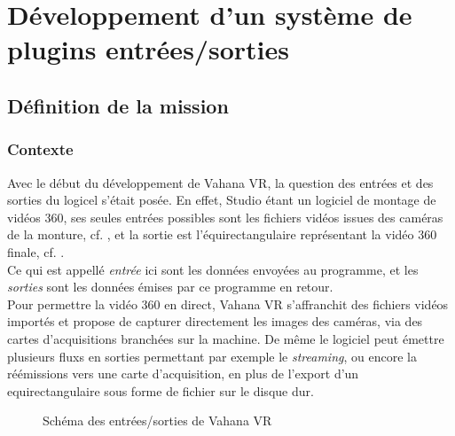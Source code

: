 \chapter{Développement d'un système de plugins entrées/sorties}

\section{Définition de la mission}
\subsection{Contexte}
Avec le début du développement de Vahana VR, la question des entrées et des sorties
du logicel s'était posée. En effet, Studio étant un logiciel de montage de vidéos
360, ses seules entrées possibles sont les fichiers vidéos issues des caméras de la monture,
cf. , et la sortie est l'équirectangulaire représentant
la vidéo 360 finale, cf. .\\
Ce qui est appellé \emph{entrée} ici sont les données envoyées au programme, et
les \emph{sorties} sont les données émises par ce programme en retour.\\
Pour permettre la vidéo 360 en direct, Vahana VR s'affranchit des fichiers
vidéos importés et propose de capturer directement les images des caméras, via
des cartes d'acquisitions branchées sur la machine. De même le logiciel peut émettre 
plusieurs fluxs en sorties permettant par exemple le \textit{streaming}, ou encore la réémissions vers
une carte d'acquisition, en plus de l'export d'un equirectangulaire sous forme de fichier
sur le disque dur.\\
\begin{figure}
  \centering
  \caption{Schéma des entrées/sorties de Vahana VR}
\end{figure}

